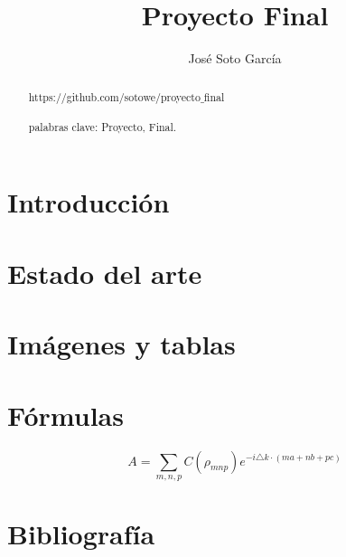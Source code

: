 \documentclass[a4paper]{article}
\title{Proyecto Final}
\author{José Soto García}
\begin{document}
\maketitle
\begin{abstract}
https://github.com/sotowe/proyecto$\_$final\\\\
palabras clave: Proyecto, Final. 
\end{abstract}
\section{Introducción}
\section{Estado del arte}
\section{Imágenes y tablas}
\section{Fórmulas}
$$A=\sum_{m,n,p}C(\rho_{mnp})e^{-i\triangle k\cdot(ma+nb+pc)}$$
\section{Bibliografía}
\end{document}
